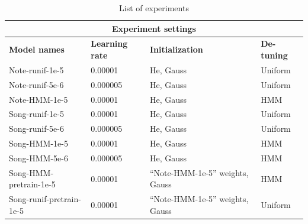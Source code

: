 \begin{table}
\centering
\begin{tabularx}{\columnwidth}{ |X|X|X|X| } 
\hline
\multicolumn{4}{|c|}{\textbf{Experiment settings}}\\
\hline\hline
\textbf{Model names} & \textbf{Learning rate} & \textbf{Initialization} & \textbf{De-tuning} \\
\hline\hline
Note-runif-1e-5 & 0.00001  & He, Gauss & Uniform \\
\hline
Note-runif-5e-6 & 0.000005 & He, Gauss & Uniform \\
\hline
Note-HMM-1e-5 & 0.00001 & He, Gauss & HMM \\ 
\hline
Song-runif-1e-5 &  0.00001 & He, Gauss & Uniform \\ 
\hline
Song-runif-5e-6 &  0.000005 & He, Gauss& Uniform \\ 
\hline
Song-HMM-1e-5 & 0.00001 & He, Gauss & HMM \\ 
\hline
Song-HMM-5e-6 & 0.000005 & He, Gauss & HMM \\ 
\hline
Song-HMM-pretrain-1e-5 & 0.00001 & ``Note-HMM-1e-5'' weights, Gauss & HMM \\ 
\hline
Song-runif-pretrain-1e-5 & 0.00001 & ``Note-HMM-1e-5'' weights, Gauss & Uniform\\
\hline
\end{tabularx}
\label{table:experiments}
\caption{List of experiments}
\end{table}

